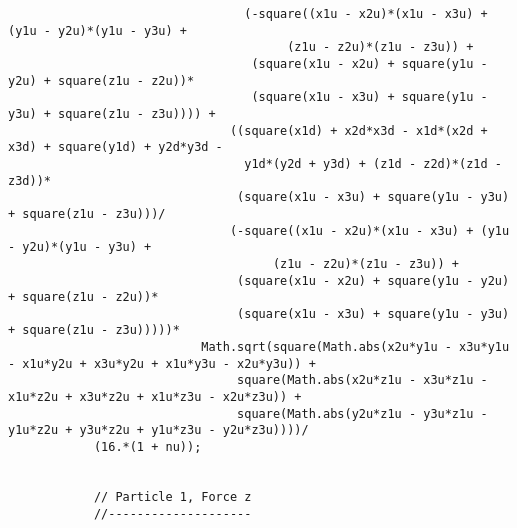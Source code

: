 \begin{lstlisting}
								 (-square((x1u - x2u)*(x1u - x3u) + (y1u - y2u)*(y1u - y3u) + 
									   (z1u - z2u)*(z1u - z3u)) + 
								  (square(x1u - x2u) + square(y1u - y2u) + square(z1u - z2u))*
								  (square(x1u - x3u) + square(y1u - y3u) + square(z1u - z3u)))) + 
							   ((square(x1d) + x2d*x3d - x1d*(x2d + x3d) + square(y1d) + y2d*y3d - 
								 y1d*(y2d + y3d) + (z1d - z2d)*(z1d - z3d))*
								(square(x1u - x3u) + square(y1u - y3u) + square(z1u - z3u)))/
							   (-square((x1u - x2u)*(x1u - x3u) + (y1u - y2u)*(y1u - y3u) + 
									 (z1u - z2u)*(z1u - z3u)) + 
								(square(x1u - x2u) + square(y1u - y2u) + square(z1u - z2u))*
								(square(x1u - x3u) + square(y1u - y3u) + square(z1u - z3u)))))*
						   Math.sqrt(square(Math.abs(x2u*y1u - x3u*y1u - x1u*y2u + x3u*y2u + x1u*y3u - x2u*y3u)) + 
								square(Math.abs(x2u*z1u - x3u*z1u - x1u*z2u + x3u*z2u + x1u*z3u - x2u*z3u)) + 
								square(Math.abs(y2u*z1u - y3u*z1u - y1u*z2u + y3u*z2u + y1u*z3u - y2u*z3u))))/
			(16.*(1 + nu));
			
			
			// Particle 1, Force z
			//--------------------
			

\end{lstlisting}
